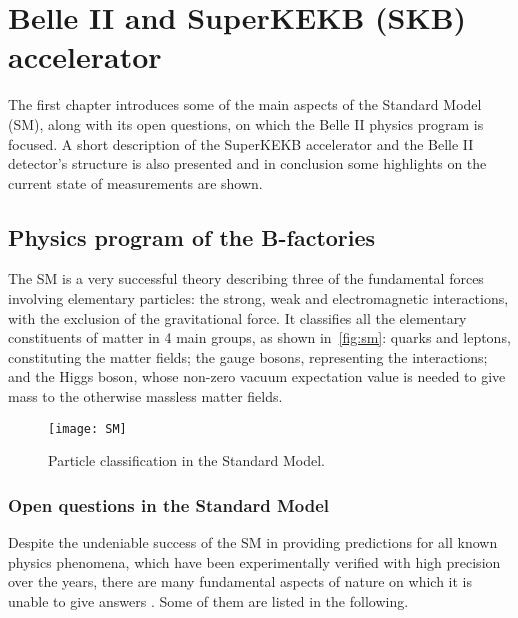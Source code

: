 
\chapter{Belle II and SuperKEKB (SKB) accelerator}\label{ch:BelleII}

The first chapter introduces some of the main aspects of the Standard Model (SM), along with its open questions, on which the Belle II physics program is focused. A short description of the SuperKEKB accelerator and the Belle II detector's structure is also presented and in conclusion some highlights on the current state of measurements are shown.


\section{Physics program of the B-factories}

The SM is a very successful theory describing three of the fundamental forces involving elementary particles: the strong, weak and electromagnetic interactions, with the exclusion of the gravitational force. It classifies all the elementary constituents of matter in 4 main groups, as shown in~\autoref{fig:sm}: quarks and leptons, constituting the matter fields; the gauge bosons, representing the interactions; and the Higgs boson, whose non-zero vacuum expectation value is needed to give mass to the otherwise massless matter fields.


\begin{figure}[h]
\centering
\texttt{[image: SM]}
\caption{Particle classification in the Standard Model.}
\label{fig:sm}
\end{figure}




\subsection{Open questions in the Standard Model}


Despite the undeniable success of the SM in providing predictions for all known physics phenomena, which have been experimentally verified with high precision over the years, there are many fundamental aspects of nature on which it is unable to give answers \cite{physics_book}. Some of them are listed in the following.

